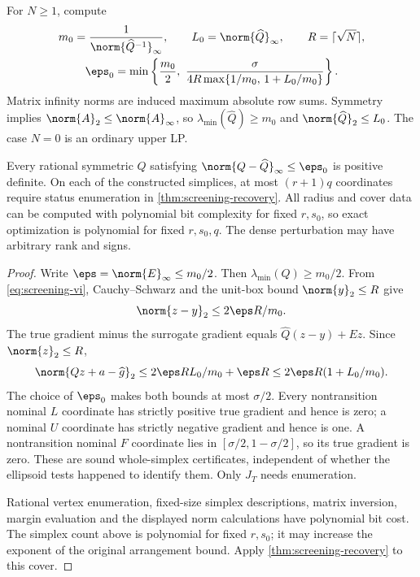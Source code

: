 For $N\ge1$, compute
\begin{equation}\label{eq:screening-radius}
 \begin{gathered}
 m_0=\frac1{\norm{\widehat Q^{-1}}_\infty},\qquad
 L_0=\norm{\widehat Q}_\infty,\qquad R=\lceil\sqrt N\rceil,\\
 \eps_0=\min\left\{\frac{m_0}{2},\
       \frac{\sigma}{4R\max\{1/m_0,\,1+L_0/m_0\}}\right\}.
 \end{gathered}
\end{equation}
Matrix infinity norms are induced maximum absolute row sums. Symmetry
implies $\norm{A}_2\le\norm{A}_\infty$, so
$\lambda_{\min}(\widehat Q)\ge m_0$ and
$\norm{\widehat Q}_2\le L_0$. The case $N=0$ is an ordinary upper LP.

\begin{corollary}
\label{cor:screening-neighborhood}
Every rational symmetric $Q$ satisfying
$\norm{Q-\widehat Q}_\infty\le\eps_0$ is positive definite. On each
of the constructed simplices, at most $(r+1)q$ coordinates require
status enumeration in \cref{thm:screening-recovery}. All radius and
cover data can be computed with polynomial bit complexity for fixed
$r,s_0$, so exact optimization is polynomial for fixed $r,s_0,q$.
The dense perturbation may have arbitrary rank and signs.
\end{corollary}
\begin{proof}
Write $\eps=\norm{E}_\infty\le m_0/2$. Then
$\lambda_{\min}(Q)\ge m_0/2$. From \eqref{eq:screening-vi},
Cauchy--Schwarz and the unit-box bound $\norm{y}_2\le R$ give
\begin{equation}\label{eq:screening-norm-response}
                          \norm{z-y}_2\le 2\eps R/m_0.
\end{equation}
The true gradient minus the surrogate gradient equals
$\widehat Q(z-y)+Ez$. Since $\norm{z}_2\le R$,
\begin{equation}\label{eq:screening-norm-gradient}
 \norm{Qz+a-\widehat g}_2
       \le 2\eps RL_0/m_0+\eps R
       \le 2\eps R(1+L_0/m_0).
\end{equation}
The choice of $\eps_0$ makes both bounds at most $\sigma/2$.
Every nontransition nominal $L$ coordinate has strictly positive true
gradient and hence is zero; a nominal $U$ coordinate has strictly
negative gradient and hence is one. A nontransition nominal $F$
coordinate lies in $[\sigma/2,1-\sigma/2]$, so its true gradient
is zero. These are sound whole-simplex certificates, independent of
whether the ellipsoid tests happened to identify them. Only $J_T$
needs enumeration.

Rational vertex enumeration, fixed-size simplex descriptions, matrix
inversion, margin evaluation and the displayed norm calculations have
polynomial bit cost. The simplex count above is polynomial for fixed
$r,s_0$; it may increase the exponent of the original arrangement
bound. Apply \cref{thm:screening-recovery} to this cover.
\end{proof}


